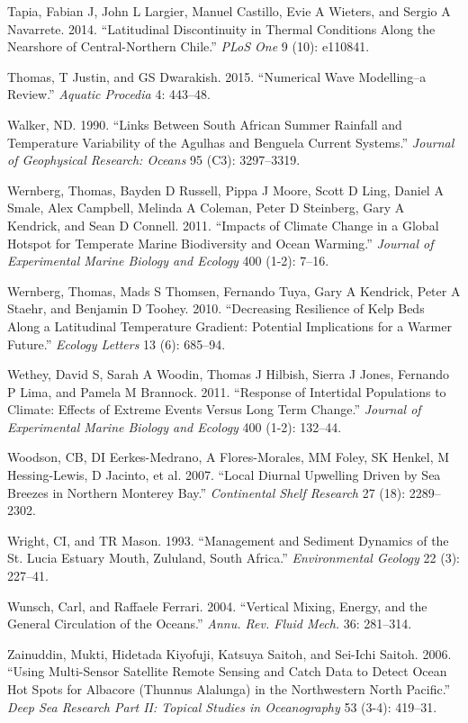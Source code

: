 \documentclass[12pt,a4paper,]{article}
\begin{document}
\leavevmode\hypertarget{ref-Tapia2014}{}%
Tapia, Fabian J, John L Largier, Manuel Castillo, Evie A Wieters, and
Sergio A Navarrete. 2014. ``Latitudinal Discontinuity in Thermal
Conditions Along the Nearshore of Central-Northern Chile.'' \emph{PLoS
One} 9 (10): e110841.

\leavevmode\hypertarget{ref-Thomas2015}{}%
Thomas, T Justin, and GS Dwarakish. 2015. ``Numerical Wave Modelling--a
Review.'' \emph{Aquatic Procedia} 4: 443--48.

\leavevmode\hypertarget{ref-Walker1990}{}%
Walker, ND. 1990. ``Links Between South African Summer Rainfall and
Temperature Variability of the Agulhas and Benguela Current Systems.''
\emph{Journal of Geophysical Research: Oceans} 95 (C3): 3297--3319.

\leavevmode\hypertarget{ref-Wernberg2011}{}%
Wernberg, Thomas, Bayden D Russell, Pippa J Moore, Scott D Ling, Daniel
A Smale, Alex Campbell, Melinda A Coleman, Peter D Steinberg, Gary A
Kendrick, and Sean D Connell. 2011. ``Impacts of Climate Change in a
Global Hotspot for Temperate Marine Biodiversity and Ocean Warming.''
\emph{Journal of Experimental Marine Biology and Ecology} 400 (1-2):
7--16.

\leavevmode\hypertarget{ref-Wernberg2010}{}%
Wernberg, Thomas, Mads S Thomsen, Fernando Tuya, Gary A Kendrick, Peter
A Staehr, and Benjamin D Toohey. 2010. ``Decreasing Resilience of Kelp
Beds Along a Latitudinal Temperature Gradient: Potential Implications
for a Warmer Future.'' \emph{Ecology Letters} 13 (6): 685--94.

\leavevmode\hypertarget{ref-Wethey2011}{}%
Wethey, David S, Sarah A Woodin, Thomas J Hilbish, Sierra J Jones,
Fernando P Lima, and Pamela M Brannock. 2011. ``Response of Intertidal
Populations to Climate: Effects of Extreme Events Versus Long Term
Change.'' \emph{Journal of Experimental Marine Biology and Ecology} 400
(1-2): 132--44.

\leavevmode\hypertarget{ref-Woodson2007}{}%
Woodson, CB, DI Eerkes-Medrano, A Flores-Morales, MM Foley, SK Henkel, M
Hessing-Lewis, D Jacinto, et al. 2007. ``Local Diurnal Upwelling Driven
by Sea Breezes in Northern Monterey Bay.'' \emph{Continental Shelf
Research} 27 (18): 2289--2302.

\leavevmode\hypertarget{ref-Wright1993}{}%
Wright, CI, and TR Mason. 1993. ``Management and Sediment Dynamics of
the St. Lucia Estuary Mouth, Zululand, South Africa.''
\emph{Environmental Geology} 22 (3): 227--41.

\leavevmode\hypertarget{ref-Wunsch2004}{}%
Wunsch, Carl, and Raffaele Ferrari. 2004. ``Vertical Mixing, Energy, and
the General Circulation of the Oceans.'' \emph{Annu. Rev. Fluid Mech.}
36: 281--314.

\leavevmode\hypertarget{ref-Zainuddin2006}{}%
Zainuddin, Mukti, Hidetada Kiyofuji, Katsuya Saitoh, and Sei-Ichi
Saitoh. 2006. ``Using Multi-Sensor Satellite Remote Sensing and Catch
Data to Detect Ocean Hot Spots for Albacore (Thunnus Alalunga) in the
Northwestern North Pacific.'' \emph{Deep Sea Research Part II: Topical
Studies in Oceanography} 53 (3-4): 419--31.
\end{document}
